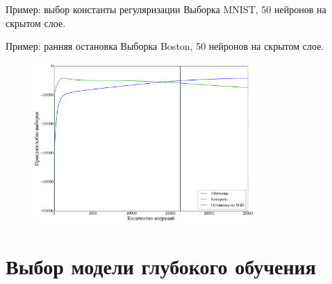 \documentclass[10pt,pdf,utf8,russian,aspectratio=169]{beamer}
\begin{document}
\begin{frame}{Пример: выбор константы регуляризации}
Выборка MNIST, 50 нейронов на скрытом слое.

\begin{figure}
  \centering
\label{fig:1}\qquad
\end{figure}

\end{frame}
\begin{frame}{Пример: ранняя остановка}
Выборка Boston, 50 нейронов на скрытом слое.


\begin{figure}
  \centering
\includegraphics[width=0.75\textwidth]{stop.png}
\end{figure}


\end{frame}


\section{Выбор модели глубокого обучения}
\end{document}
